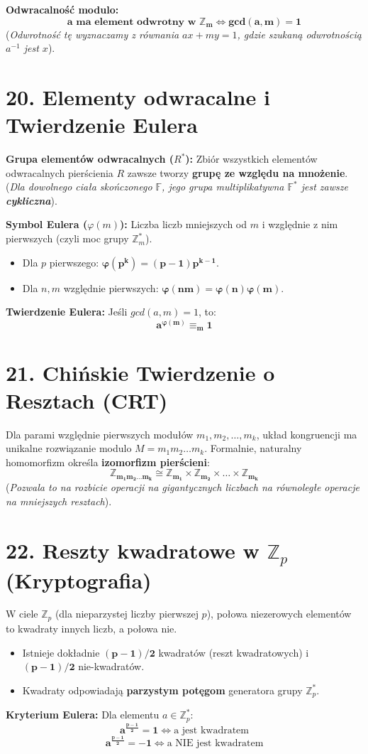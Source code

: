 \documentclass[12pt,a4paper]{article}
\begin{document}
\noindent\textbf{Odwracalność modulo:} %
$$ \mathbf{a \text{ ma element odwrotny w } \mathbb{Z}_m \iff gcd(a,m) = 1} $$ %
(\textit{Odwrotność tę wyznaczamy z równania $ax + my = 1$, gdzie szukaną odwrotnością $a^{-1}$ jest $x$}). %

\section*{20. Elementy odwracalne i Twierdzenie Eulera}
\noindent\textbf{Grupa elementów odwracalnych ($R^*$):} Zbiór wszystkich elementów odwracalnych pierścienia $R$ zawsze tworzy \textbf{grupę ze względu na mnożenie}. %
(\textit{Dla dowolnego ciała skończonego $\mathbb{F}$, jego grupa multiplikatywna $\mathbb{F}^*$ jest zawsze \textbf{cykliczna}}). %

\noindent\textbf{Symbol Eulera ($\varphi(m)$):} Liczba liczb mniejszych od $m$ i względnie z nim pierwszych (czyli moc grupy $\mathbb{Z}_m^*$). %
\begin{itemize}
    \item Dla $p$ pierwszego: $\mathbf{\varphi(p^k) = (p-1)p^{k-1}}$. %
    \item Dla $n, m$ względnie pierwszych: $\mathbf{\varphi(nm) = \varphi(n)\varphi(m)}$. %
\end{itemize}

\noindent\textbf{Twierdzenie Eulera:} Jeśli $gcd(a, m) = 1$, to: %
$$ \mathbf{a^{\varphi(m)} \equiv_m 1} $$ %

\section*{21. Chińskie Twierdzenie o Resztach (CRT)}
Dla parami względnie pierwszych modułów $m_1, m_2, \dots, m_k$, układ kongruencji ma unikalne rozwiązanie modulo $M = m_1 m_2 \dots m_k$. %
Formalnie, naturalny homomorfizm określa \textbf{izomorfizm pierścieni}: %
$$ \mathbf{\mathbb{Z}_{m_1 m_2 \dots m_k} \cong \mathbb{Z}_{m_1} \times \mathbb{Z}_{m_2} \times \dots \times \mathbb{Z}_{m_k}} $$ %
(\textit{Pozwala to na rozbicie operacji na gigantycznych liczbach na równoległe operacje na mniejszych resztach}). %

\section*{22. Reszty kwadratowe w $\mathbb{Z}_p$ (Kryptografia)}
W ciele $\mathbb{Z}_p$ (dla nieparzystej liczby pierwszej $p$), połowa niezerowych elementów to kwadraty innych liczb, a połowa nie. %
\begin{itemize}
    \item Istnieje dokładnie $\mathbf{(p-1)/2}$ kwadratów (reszt kwadratowych) i $\mathbf{(p-1)/2}$ nie-kwadratów. %
    \item Kwadraty odpowiadają \textbf{parzystym potęgom} generatora grupy $\mathbb{Z}_p^*$. %
\end{itemize}

\noindent\textbf{Kryterium Eulera:} Dla elementu $a \in \mathbb{Z}_p^*$: %
$$ \mathbf{a^{\frac{p-1}{2}} = 1} \iff \text{a jest kwadratem} $$ %
$$ \mathbf{a^{\frac{p-1}{2}} = -1} \iff \text{a NIE jest kwadratem} $$ %
\end{document}
